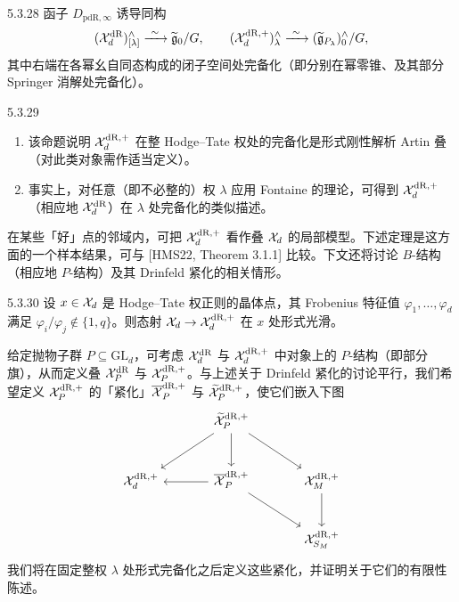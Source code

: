 
\begin{prop}{5.3.28}\label{prop:a4-5-3-28}
函子 $D_{\mathrm{pdR},\infty}$ 诱导同构
\[
(\mathcal{X}_d^{\mathrm{dR}})^{\wedge}_{[\lambda]}\xrightarrow{\ \sim\ }\widetilde{\mathfrak{g}}_0/G,\qquad
(\mathcal{X}_d^{\mathrm{dR},+})^{\wedge}_{\lambda}\xrightarrow{\ \sim\ }(\widetilde{\mathfrak{g}}_{P_\lambda})^{\wedge}_0/G,
\]
其中右端在各幂幺自同态构成的闭子空间处完备化（即分别在幂零锥、及其部分 Springer 消解处完备化）。
\end{prop}

\begin{rem}{5.3.29}\label{rem:a4-5-3-29}
\begin{enumerate}[label=(\alph*),leftmargin=2.2em,itemsep=0.1em]
\item 该命题说明 $\mathcal{X}_d^{\mathrm{dR},+}$ 在整 Hodge–Tate 权处的完备化是形式刚性解析 Artin 叠（对此类对象需作适当定义）。
\item 事实上，对任意（即不必整的）权 $\lambda$ 应用 Fontaine 的理论，可得到 $\mathcal{X}_d^{\mathrm{dR},+}$（相应地 $\mathcal{X}_d^{\mathrm{dR}}$）在 $\lambda$ 处完备化的类似描述。
\end{enumerate}
\end{rem}

在某些「好」点的邻域内，可把 $\mathcal{X}_d^{\mathrm{dR},+}$ 看作叠 $\mathcal{X}_d$ 的局部模型。下述定理是这方面的一个样本结果，可与 [HMS22, Theorem 3.1.1] 比较。下文还将讨论 $B$-结构（相应地 $P$-结构）及其 Drinfeld 紧化的相关情形。

\begin{thm}{5.3.30}\label{thm:a4-5-3-30}
设 $x\in\mathcal{X}_d$ 是 Hodge–Tate 权正则的晶体点，其 Frobenius 特征值 $\varphi_1,\dots,\varphi_d$ 满足 $\varphi_i/\varphi_j\notin\{1,q\}$。则态射 $\mathcal{X}_d\to\mathcal{X}_d^{\mathrm{dR},+}$ 在 $x$ 处形式光滑。
\end{thm}

给定抛物子群 $P\subseteq\mathrm{GL}_d$，可考虑 $\mathcal{X}_d^{\mathrm{dR}}$ 与 $\mathcal{X}_d^{\mathrm{dR},+}$ 中对象上的 $P$-结构（即部分旗），从而定义叠 $\mathcal{X}_P^{\mathrm{dR}}$ 与 $\mathcal{X}_P^{\mathrm{dR},+}$。与上述关于 Drinfeld 紧化的讨论平行，我们希望定义 $\mathcal{X}_P^{\mathrm{dR},+}$ 的「紧化」$\overline{\mathcal{X}}_P^{\mathrm{dR},+}$ 与 $\widetilde{\mathcal{X}}_P^{\mathrm{dR},+}$，使它们嵌入下图
\[
\begin{tikzcd}[row sep=large,column sep=large]
 & \wt\XX_P^{\mathrm{dR},+}\arrow[dl]\arrow[d]\arrow[dr] & \\
 \XX_d^{\mathrm{dR},+} & \ol\XX_P^{\mathrm{dR},+}\arrow[l]\arrow[dr] & \XX_M^{\mathrm{dR},+}\arrow[d]\\
 & & \XX_{S_M}^{\mathrm{dR},+}
\end{tikzcd}
\]
我们将在固定整权 $\lambda$ 处形式完备化之后定义这些紧化，并证明关于它们的有限性陈述。

